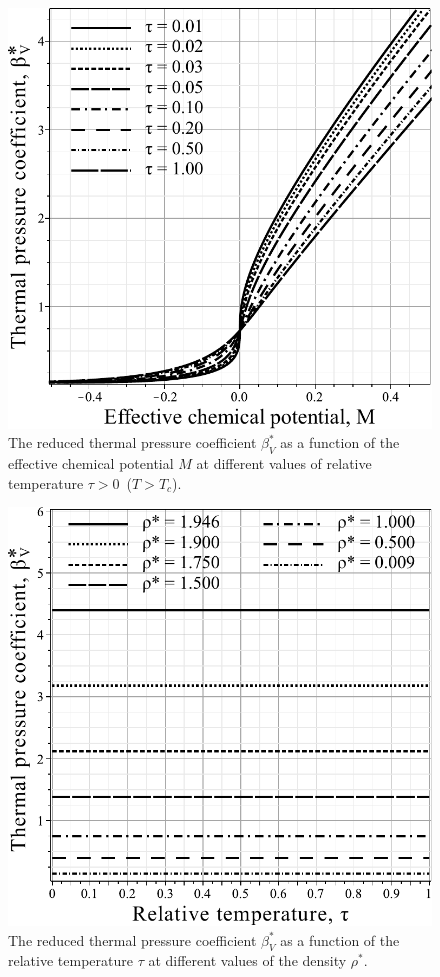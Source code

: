 \begin{figure}[h!]
	\includegraphics[width=\column]{f3b.pdf}
	\vskip-3mm
	\caption{The reduced thermal pressure coefficient $\beta^*_V$ as a function of the effective chemical potential $M$ at different values of relative temperature $\tau > 0$~($T > T_c$). 
	}
	\label{fig3b}
\end{figure}
\begin{figure}[h!]
	\includegraphics[width=\column]{f3c.pdf}
	\vskip-3mm
	\caption{The reduced thermal pressure coefficient $\beta^*_V$ as a function of the relative temperature $\tau$ at different values of the density $\rho^*$. 
	}
	\label{fig3c}
\end{figure}

